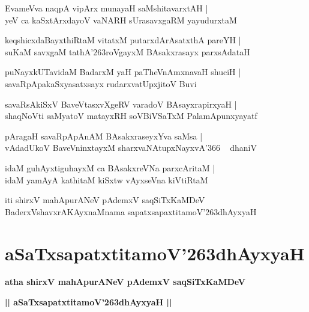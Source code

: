 \documentclass[twoside,12pt,openright]{book}
\def\S{\char'263}
\newcounter{shloka}[chapter]
\begin{document}
\begin{shloka}%
EvameVva naqpA vipArx munayaH saMshitavarxtAH |\\
yeV ca kaSxtArxdayoV vaNARH sUrasavxgaRM yayudurxtaM 
\end{shloka}

\begin{shloka}%
keqshicxdaBayxthiRtaM vitatxM putarxdArAsatxthA pareYH |\\
suKaM savxgaM tathA\S roVgayxM BAsakxrasayx parxsAdataH 
\end{shloka}

\begin{shloka}%
puNayxkUTavidaM BadarxM yaH paTheVnAmxnavaH shuciH |\\
savaRpApakaSxyasatxsayx rudarxvatUpxjitoV Buvi
\end{shloka}

\begin{shloka}%
savaRsAkiSxV BaveVtasxvXgeRV varadoV BAsayxrapirxyaH |\\
shaqNoVti saMyatoV matayxRH soVBiVSaTxM PalamApunxyayatf
\end{shloka}

\begin{shloka}%
pAragaH savaRpApAnAM BAsakxraseyxYva saMsa |\\
vAdadUkoV BaveVninxtayxM sharxvaNAtupxNayxvA\char'366 ~ dhaniV 
\end{shloka}

\begin{shloka}%
idaM guhAyxtiguhayxM ca BAsakxreVNa parxcAritaM |\\
idaM yamAyA kathitaM kiSxtw vAyxseVna kiVtiRtaM 
\end{shloka}

\begin{center}
iti shirxV mahApurANeV pAdemxV saqSiTxKaMDeV BaderxVshavxrAKAyxnaMnama sapatxsapaxtitamoV\S dhAyxyaH 
\end{center}

\chapter{aSaTxsapatxtitamoV\S dhAyxyaH}

\begin{center}
{\LARGE\bfseries atha shirxV mahApurANeV pAdemxV saqSiTxKaMDeV}
\end{center}

\begin{center}
{\LARGE\bfseries || aSaTxsapatxtitamoV\S dhAyxyaH || }
\end{center}
\end{document}
